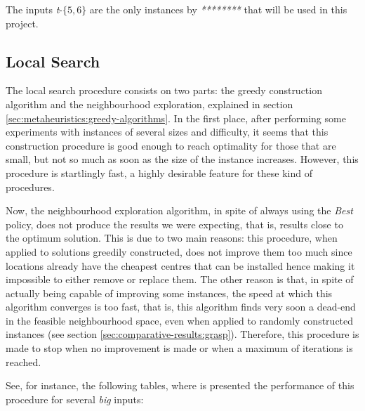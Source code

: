 The inputs \textit{t}-$\{5,6\}$ are the only instances by \textit{********} that will be
used in this project.

\subsection{Local Search}
\label{sec:comparative-results:local-search}

The local search procedure consists on two parts: the greedy construction algorithm and the
neighbourhood exploration, explained in section \ref{sec:metaheuristics:greedy-algorithms}.
In the first place, after performing some experiments with instances of several sizes and
difficulty, it seems that this construction procedure is good enough to reach optimality for
those that are small, but not so much as soon as the size of the instance increases. However,
this procedure is startlingly fast, a highly desirable feature for these kind of procedures.

\hfill

Now, the neighbourhood exploration algorithm, in spite of always using the \textit{Best}
policy, does not produce the results we were expecting, that is, results close to the optimum
solution. This is due to two main reasons: this procedure, when applied to solutions greedily
constructed, does not improve them too much since locations already have the cheapest centres
that can be installed hence making it impossible to either remove or replace them. The
other reason is that, in spite of actually being capable of improving some instances, the
speed at which this algorithm converges is too fast, that is, this algorithm finds very soon a
dead-end in the feasible neighbourhood space, even when applied to randomly constructed
instances (see section \ref{sec:comparative-results:grasp}). Therefore, this procedure is made
to stop when no improvement is made or when a maximum of iterations is reached.

\hfill

See, for instance, the following tables, where is presented the performance of this procedure
for several \textit{big} inputs:


